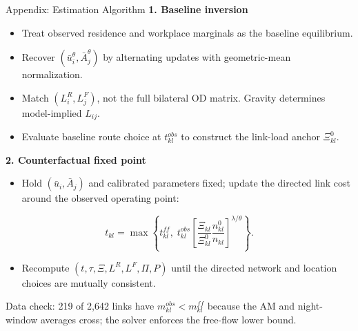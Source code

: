 \documentclass[11pt,aspectratio=169]{beamer}
\newcommand{\navback}[1]{\par\vspace{0.35em}\noindent\hfill\hyperlink{#1}{\beamerreturnbutton{back}}}
\begin{document}
\begin{frame}[label=appfund]{Appendix: Estimation Algorithm}
\small\textbf{1. Baseline inversion}\par
\vspace{0.12em}
\begin{itemize}\footnotesize\setlength\itemsep{0.22em}
  \item Treat observed residence and workplace marginals as the baseline equilibrium.
  \item Recover $(\bar u_i^\theta,\bar A_j^\theta)$ by alternating updates with geometric-mean normalization.
  \item Match $(L_i^R,L_j^F)$, not the full bilateral OD matrix. Gravity determines model-implied $L_{ij}$.
  \item Evaluate baseline route choice at $t_{kl}^{obs}$ to construct the link-load anchor $\Xi_{kl}^{0}$.
\end{itemize}
\vspace{0.18em}
\small\textbf{2. Counterfactual fixed point}\par
\vspace{0.08em}
\begin{itemize}\footnotesize\setlength\itemsep{0.18em}
  \item Hold $(\bar u_i,\bar A_j)$ and calibrated parameters fixed; update the directed link cost around the observed operating point:
\end{itemize}
\vspace{-0.65em}
\[
  t_{kl}=\max\!\left\{t_{kl}^{ff},\;
  t_{kl}^{obs}
  \left[
  \frac{\Xi_{kl}}{\Xi_{kl}^{0}}
  \frac{n_{kl}^{0}}{n_{kl}}
  \right]^{\lambda/\theta}\right\}.
\]
\vspace{-0.70em}
\begin{itemize}\footnotesize\setlength\itemsep{0.18em}
  \item Recompute $(t,\tau,\Xi,L^R,L^F,\Pi,P)$ until the directed network and location choices are mutually consistent.
\end{itemize}
\vspace{0.08em}
{\scriptsize\color{gray!80} Data check: 219 of 2,642 links have $m_{kl}^{obs}<m_{kl}^{ff}$ because the AM and night-window averages cross; the solver enforces the free-flow lower bound.}
\navback{fundamentals}
\end{frame}
\end{document}
